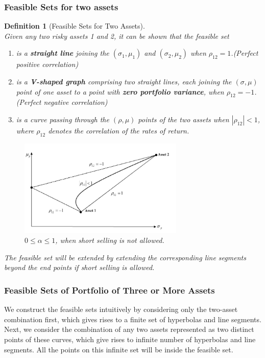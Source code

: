 \documentclass[12pt]{article}
\newtheorem{definition}{Definition}[section]
\theoremstyle{definition}
\begin{document}
\subsubsection{Feasible Sets for two assets}
\begin{definition}[Feasible Sets for Two Assets]
\hfill\\\normalfont Given any two risky assets 1 and 2, it can be shown that the feasible set
\begin{enumerate}
  \item is a \textbf{straight line} joining the $(\sigma_1, \mu_1)$ and $(\sigma_2,\mu_2)$ when $\rho_{12}=1$.(Perfect positive correlation)
  \item is a \textbf{V-shaped graph} comprising two straight lines, each joining the $(\sigma,\mu)$ point of one asset to a point with \textbf{zero portfolio variance}, when $\rho_{12}=-1$.(Perfect negative correlation)
  \item is a curve passing through the $(\rho,\mu)$ points of the two assets when $|\rho_{12}|<1$, where $\rho_{12}$ denotes the correlation of the rates of return.
\end{enumerate}
\begin{figure}[h]
\centering
\includegraphics[width = 0.7\textwidth]{4_1.png}
\caption{$0\leq \alpha\leq 1$, when short selling is not allowed.}
\end{figure}
The feasible set will be extended by extending the corresponding line segments beyond the end points if short selling \textit{is} allowed.
\end{definition}
\subsubsection{Feasible Sets of Portfolio of Three or More Assets}
We construct the feasible sets intuitively by considering only the two-asset combination first, which gives rises to a finite set of hyperbolas and line segments. Next, we consider the combination of any two assets represented as two distinct points of these curves, which give rises to infinite number of hyperbolas and line segments. All the points on this infinite set will be inside the feasible set.
\end{document}
